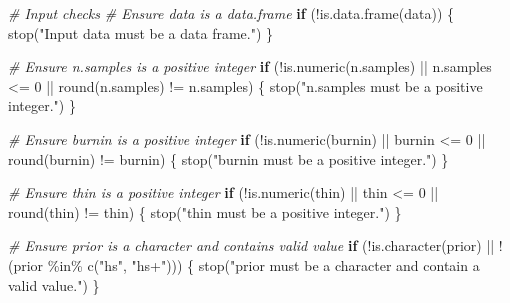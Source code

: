 \documentclass[
  11pt,
]{article}
\newenvironment{Shaded}{}{}
\newcommand{\CommentTok}[1]{\textcolor[rgb]{0.38,0.63,0.69}{\textit{#1}}}
\newcommand{\ControlFlowTok}[1]{\textcolor[rgb]{0.00,0.44,0.13}{\textbf{#1}}}
\newcommand{\DecValTok}[1]{\textcolor[rgb]{0.25,0.63,0.44}{#1}}
\newcommand{\FunctionTok}[1]{\textcolor[rgb]{0.02,0.16,0.49}{#1}}
\newcommand{\NormalTok}[1]{#1}
\newcommand{\SpecialCharTok}[1]{\textcolor[rgb]{0.25,0.44,0.63}{#1}}
\newcommand{\StringTok}[1]{\textcolor[rgb]{0.25,0.44,0.63}{#1}}
\begin{document}
\begin{Shaded}
\begin{Highlighting}[]
  \CommentTok{\# Input checks}
  \CommentTok{\# Ensure data is a data.frame}
  \ControlFlowTok{if}\NormalTok{ (}\SpecialCharTok{!}\FunctionTok{is.data.frame}\NormalTok{(data)) \{}
    \FunctionTok{stop}\NormalTok{(}\StringTok{"Input \textquotesingle{}data\textquotesingle{} must be a data frame."}\NormalTok{)}
\NormalTok{  \}}
  
  \CommentTok{\# Ensure \textquotesingle{}n.samples\textquotesingle{} is a positive integer}
  \ControlFlowTok{if}\NormalTok{ (}\SpecialCharTok{!}\FunctionTok{is.numeric}\NormalTok{(n.samples) }\SpecialCharTok{||}\NormalTok{ n.samples }\SpecialCharTok{\textless{}=} \DecValTok{0} \SpecialCharTok{||} \FunctionTok{round}\NormalTok{(n.samples) }\SpecialCharTok{!=}\NormalTok{ n.samples) \{}
    \FunctionTok{stop}\NormalTok{(}\StringTok{"\textquotesingle{}n.samples\textquotesingle{} must be a positive integer."}\NormalTok{)}
\NormalTok{  \}}
  
  \CommentTok{\# Ensure \textquotesingle{}burnin\textquotesingle{} is a positive integer}
  \ControlFlowTok{if}\NormalTok{ (}\SpecialCharTok{!}\FunctionTok{is.numeric}\NormalTok{(burnin) }\SpecialCharTok{||}\NormalTok{ burnin }\SpecialCharTok{\textless{}=} \DecValTok{0} \SpecialCharTok{||} \FunctionTok{round}\NormalTok{(burnin) }\SpecialCharTok{!=}\NormalTok{ burnin) \{}
    \FunctionTok{stop}\NormalTok{(}\StringTok{"\textquotesingle{}burnin\textquotesingle{} must be a positive integer."}\NormalTok{)}
\NormalTok{  \}}
  
  \CommentTok{\# Ensure \textquotesingle{}thin\textquotesingle{} is a positive integer}
  \ControlFlowTok{if}\NormalTok{ (}\SpecialCharTok{!}\FunctionTok{is.numeric}\NormalTok{(thin) }\SpecialCharTok{||}\NormalTok{ thin }\SpecialCharTok{\textless{}=} \DecValTok{0} \SpecialCharTok{||} \FunctionTok{round}\NormalTok{(thin) }\SpecialCharTok{!=}\NormalTok{ thin) \{}
    \FunctionTok{stop}\NormalTok{(}\StringTok{"\textquotesingle{}thin\textquotesingle{} must be a positive integer."}\NormalTok{)}
\NormalTok{  \}}
  
  \CommentTok{\# Ensure \textquotesingle{}prior\textquotesingle{} is a character and contains valid value}
  \ControlFlowTok{if}\NormalTok{ (}\SpecialCharTok{!}\FunctionTok{is.character}\NormalTok{(prior) }\SpecialCharTok{||} \SpecialCharTok{!}\NormalTok{(prior }\SpecialCharTok{\%in\%} \FunctionTok{c}\NormalTok{(}\StringTok{"hs"}\NormalTok{, }\StringTok{"hs+"}\NormalTok{))) \{}
    \FunctionTok{stop}\NormalTok{(}\StringTok{"\textquotesingle{}prior\textquotesingle{} must be a character and contain a valid value."}\NormalTok{)}
\NormalTok{  \}}


\end{Highlighting}
\end{Shaded}
\end{document}
